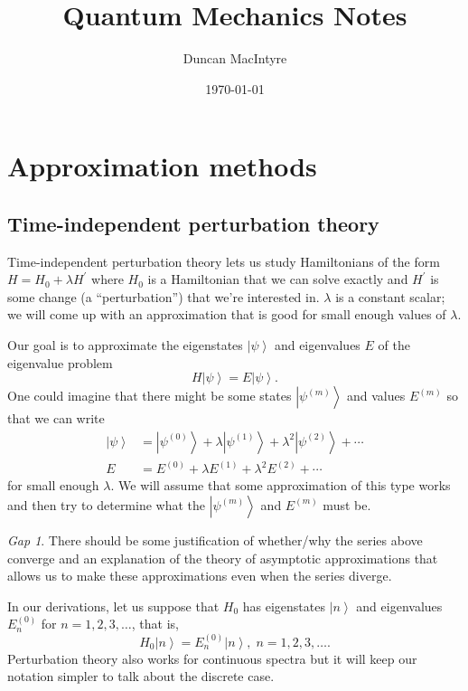 \documentclass[11pt]{article}
\newcommand{\ket}[1]{\left|#1\right\rangle}
\theoremstyle{theorem}
\theoremstyle{remark}
\theoremstyle{step}
\theoremstyle{gap}
\newtheorem*{gap}{Gap}
\begin{document}
\title{Quantum Mechanics Notes}
\author{Duncan MacIntyre}
\date{\today}
\maketitle
\tableofcontents
\bigskip
\newpage

\section{Approximation methods}

\subsection{Time-independent perturbation theory}
\newcommand{\ks}{\ket{\psi}}
\newcommand{\ksp}[1]{\ket{\psi^{(#1)}}}
\newcommand{\ksn}[1]{\ket{\psi_{#1}}}
\newcommand{\ksnp}[2]{\ket{\psi^{(#2)}_{#1}}}


Time-independent perturbation theory lets us study Hamiltonians of the form \(H = H_0 + \lambda H^\prime\) where \(H_0\) is a Hamiltonian that we can solve exactly and \(H^\prime\) is some change (a ``perturbation'') that we're interested in. \(\lambda\) is a constant scalar; we will come up with an approximation that is good for small enough values of \(\lambda\).

Our goal is to approximate the eigenstates \(\ks\) and eigenvalues \(E\) of the eigenvalue problem \[H \ks = E \ks.\]
One could imagine that there might be some states \(\ksp{m}\) and values \(E^{(m)}\) so that we can write
\begin{align}
\ks &= \ksp{0} + \lambda \ksp{1} + \lambda^2 \ksp{2} + \cdots \label{tipt.eq.assumption-states}\\
E &= E^{(0)} + \lambda E^{(1)} + \lambda^2 E^{(2)} + \cdots \label{tipt.eq.assumption-states}
\end{align}
for small enough \(\lambda\). We will assume that some approximation of this type works and then try to determine what the \(\ksp{m}\) and \(E^{(m)}\) must be.

\begin{gap}
There should be some justification of whether/why the series above converge and an explanation of the theory of asymptotic approximations that allows us to make these approximations even when the series diverge.
\end{gap}

In our derivations, let us suppose that \(H_0\) has eigenstates \(\ket{n}\) and eigenvalues \(E_n^{(0)}\) for \(n=1, 2, 3, \ldots\), that is, \[H_0 \ket{n} = E_n^{(0)} \ket{n}, \; n=1, 2, 3, \ldots.\] Perturbation theory also works for continuous spectra but it will keep our notation simpler to talk about the discrete case.
\end{document}
